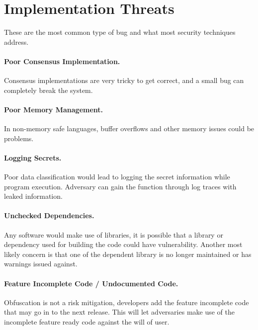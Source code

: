 
\section{Implementation Threats}
These are the most common type of bug and what most security techniques address.

\paragraph{Poor Consensus Implementation.} Consensus implementations are very tricky to get correct, and a small bug can completely break the system.

\paragraph{Poor Memory Management.} In non-memory safe languages, buffer overflows and other memory issues could be problems.

\paragraph{Logging Secrets.} Poor data classification would lead to logging the secret information while program execution. Adversary can gain the function through log traces with leaked information.

\paragraph{Unchecked Dependencies.} Any software would make use of libraries, it is possible that a library or dependency used for building the code could have vulnerability. Another most likely concern is that one of the dependent library is no longer maintained or has warnings issued against.

\paragraph{Feature Incomplete Code / Undocumented Code.} Obfuscation is not a risk mitigation, developers add the feature incomplete code that may go in to the next release. This will let adversaries make use of the incomplete feature ready code against the will of user.